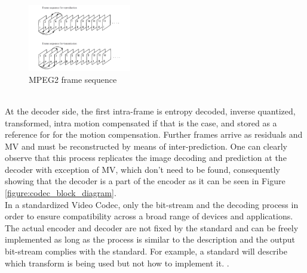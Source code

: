 \documentclass[a4paper,11pt,oneside]{article}
\begin{document}
\begin{figure}[h]
  \centering
  \includegraphics[width=0.4\textwidth]{../figures/frame_sequence_mpeg2.pdf}
  \caption{MPEG2 frame sequence \cite[pp.98]{dsp_henkel}}
  \label{figure:mpeg2_frame_sequence}
\end{figure} \\
\indent At the decoder side, the first intra-frame is entropy decoded, inverse quantized, transformed, intra motion compensated if that is the case, and stored as a reference for for the motion compensation. Further frames arrive as residuals and MV and must be reconstructed by means of inter-prediction. One can clearly observe that this process replicates the image decoding and prediction at the decoder with exception of MV, which don't need to be found, consequently showing that the decoder is a part of the encoder as it can be seen in Figure \ref{figure:codec_block_diagram}. \\
\indent In a standardized Video Codec, only the bit-stream and the decoding process in order to ensure compatibility across a broad range of devices and applications. The actual encoder and decoder are not fixed by the standard and can be freely implemented as long as the process is similar to the description and the output bit-stream complies with the standard. For example, a standard will describe which transform is being used but not how to implement it. \cite{vsp_coursera}.
\end{document}
